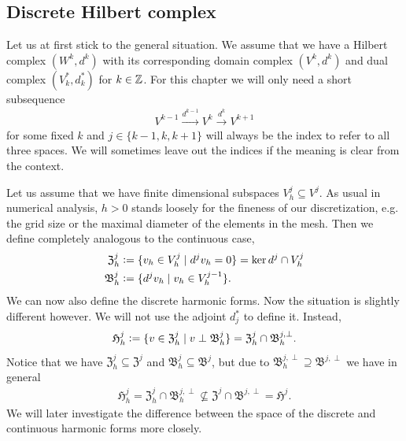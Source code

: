 \documentclass[../master_thesis.tex]{subfiles}
\begin{document}
\subsection{Discrete Hilbert complex}\label{sec:discrete_hilbert_complex}

Let us at first stick to the general situation. We assume that we have a Hilbert complex 
$(W^k,d^k)$ with its corresponding domain complex 
$(V^k,d^k)$ and dual complex $(V^*_k,d^*_k)$ for $k \in \mathbb{Z}$. For this chapter 
we will only need a short subsequence 
\begin{align*}
    V^{k-1} \xrightarrow{d^{k-1}} V^k \xrightarrow{d^{k}} V^{k+1}
\end{align*}
for some fixed $k$ and $j \in \{k-1,k,k+1\}$ will always be the index to refer to 
all three spaces. We will sometimes leave out the indices if the meaning is clear from the context.

Let us assume that we have finite dimensional subspaces $V_h^j \subseteq V^j$. 
As usual in numerical analysis, $h>0$ stands loosely for the fineness of our discretization, 
e.g. the grid size or the maximal diameter of the elements in the mesh.
Then we define completely analogous to the continuous case,
\begin{align*}
    \mathfrak{Z}_h^j &\vcentcolon= \{ v_h \in V_h^j \mid d^j v_h = 0 \} = \ker d^j \cap V^j_h
    \\ \mathfrak{B}^j_h &\vcentcolon= \{ d^j v_h \mid v_h \in V_h^{j-1} \}.
\end{align*}
We can now also define the discrete harmonic forms. Now the situation is slightly 
different however. We will not use the adjoint $d^*_j$ to define it.
Instead,
\begin{align*}
    \mathfrak{H}_h^j \vcentcolon= \{ v \in \mathfrak{Z}_h^j \mid v \perp \mathfrak{B}^j_h \}
        = \mathfrak{Z}_h^j \cap \mathfrak{B}_h^{j,\perp}.
\end{align*}
Notice that we have $\mathfrak{Z}_h^j \subseteq \mathfrak{Z}^j$ and 
$\mathfrak{B}_h^j \subseteq \mathfrak{B}^j$, but due to 
$\mathfrak{B}_h^{j,\perp} \supseteq \mathfrak{B}^{j,\perp}$ we have in general
\begin{align*}
    \mathfrak{H}^j_h = \mathfrak{Z}_h^j \cap \mathfrak{B}_h^{j,\perp} 
    \not\subseteq    \mathfrak{Z}^j \cap \mathfrak{B}^{j,\perp} = \mathfrak{H}^j.
\end{align*}
We will later investigate the difference between the space of the discrete and continuous 
harmonic forms more closely.
\end{document}
